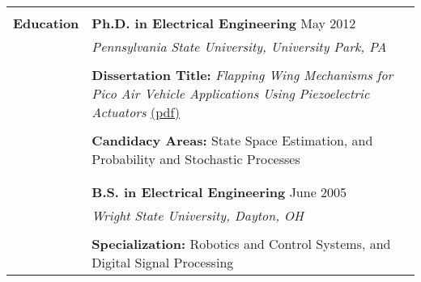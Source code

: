 \begin{tabular}{L{\hlcolw}  L{\rcolw}}
    \\ 
    \hline  
    \hline   
    \\
\textbf{\Large Education} & \textbf{\large Ph.D. in Electrical Engineering} \hfill {\large May 2012} 
\vspace{0.05in} \\ 
& {\it\large Pennsylvania State University, University Park, PA} \\ \\
&  \textbf{Dissertation Title:} \textit{Flapping Wing Mechanisms for Pico Air Vehicle Applications Using Piezoelectric Actuators}
\href{https://www.me.psu.edu/mrl/theses/mateti.pdf}{(pdf)} 
\\
\\
&  \textbf{Candidacy Areas:} State Space Estimation, and Probability and Stochastic Processes
\\
\\
&
\vspace{-0.1in} 
%
\\
& \textbf{\large B.S. in Electrical Engineering} \hfill {\large June 2005}
\vspace{0.05in} \\
& {\it\large Wright State University, Dayton, OH} \\ \\ 
&  \textbf{Specialization:} Robotics and Control Systems, and Digital Signal Processing
\end{tabular}